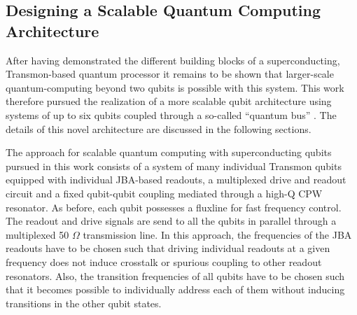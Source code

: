 \subsection{Designing a Scalable Quantum Computing Architecture}

After having demonstrated the different building blocks of a superconducting, Transmon-based quantum processor it remains to be shown that larger-scale quantum-computing beyond two qubits is possible with this system. This work therefore pursued the realization of a more scalable qubit architecture using systems of up to six qubits coupled through a so-called ``quantum bus'' \citep{majer_coupling_2007}. The details of this novel architecture are discussed in the following sections.

The approach for scalable quantum computing with superconducting qubits pursued in this work consists of a system of many individual Transmon qubits equipped with individual JBA-based readouts, a multiplexed drive and readout circuit and a fixed qubit-qubit coupling mediated through a high-Q CPW resonator. As before, each qubit possesses a fluxline for fast frequency control. The readout and drive signals are send to all the qubits in parallel through a multiplexed 50 $\Omega$ transmission line. In this approach, the frequencies of the JBA readouts have to be chosen such that driving individual readouts at a given frequency does not induce crosstalk or spurious coupling to other readout resonators. Also, the transition frequencies of all qubits have to be chosen such that it becomes possible to individually address each of them without inducing transitions in the other qubit states.


\begin{figure}
	\centering
	\label{fig:iSwap1}
	\caption{}
\end{figure}
